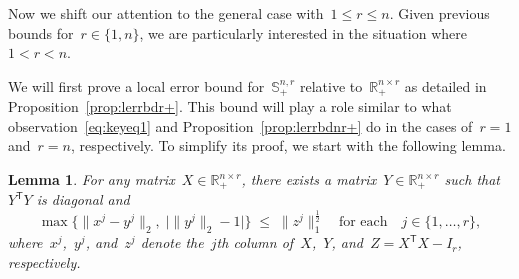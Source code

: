 \documentclass[11pt,a4paper]{article}  %
\newtheorem{lemma}{Lemma}%
\theoremstyle{definition}
\newcommand{\RR}{\mathbb{R}}
\newcommand{\col}{r}
\newcommand{\stf}[1]{\mathbb{S}^{#1}}
\newcommand{\trs}{{\scriptstyle{\mathsf{T}}}}
\begin{document}
Now we shift our attention to the general case with~$1 \le \col \le n$.
Given previous bounds for~$\col\in\{1, n\}$, we are particularly interested in the situation where~$1 < \col < n$.

We will first prove a local error bound for~$\stf{n,\col}_+$ relative to~$\RR^{n\times \col}_+$
as detailed in Proposition~\ref{prop:lerrbdr+}.
This bound will play a role similar to what observation~\eqref{eq:keyeq1} and
Proposition~\ref{prop:lerrbdnr+} do in the cases of~$\col = 1$ and~$\col=n$, respectively.
To simplify its proof, we start with the following lemma.
\begin{lemma}
    \label{lem:xyz}
    For any matrix~$X\in\RR^{n\times \col}_+$, there exists a matrix~$Y\in\RR^{n\times \col}_+$ such
    that~$Y^\trs Y$ is diagonal and
    \begin{equation}
        \label{eq:xyz}
        \max\big\{\|x^j - y^j\|_2,\; \big|\|y^j\|_2 - 1\big|\big\}
        \;\le\; \|z^j\|_1^{\frac{1}{2}}
        \quad \text{for each} \quad j \in\{1, \dots, \col\},
    \end{equation}
    where~$x^j$,~$y^j$, and~$z^j$ denote the~$j$th column of~$X$,~$Y$, and~$Z =  X^\trs X - I_\col$,
    respectively.
\end{lemma}
\end{document}
